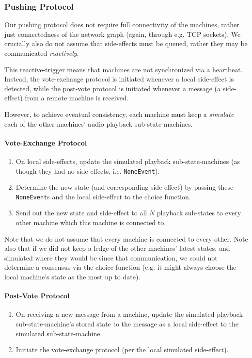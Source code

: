 \documentclass[%
               nonacm,sigconf,10pt]{acmart}
\newcommand{\py}[1]{\texttt{#1}}
\begin{document}
\subsubsection{Pushing Protocol}\label{subsubsec:push-proto}

Our pushing protocol does not require full connectivity of the machines, rather just connectedness of the network graph (again, through e.g. TCP sockets). We crucially also do not assume that side-effects must be queued, rather they may be communicated {\it reactively}. 

This reactive-trigger means that machines are not synchronized via a heartbeat. Instead, the vote-exchange protocol is initiated whenever a local side-effect is detected, while the post-vote protocol is initiated whenever a message (a side-effect) from a remote machine is received.

However, to achieve eventual consistency, each machine must keep a {\it simulate} each of the other machines' audio playback sub-state-machines.

\paragraph{Vote-Exchange Protocol}
\begin{enumerate}
    \item On local side-effects, update the simulated playback sub-state-machines (as though they had no side-effects, i.e. \py{NoneEvent}).
    \item Determine the new state (and corresponding side-effect) by passing these \py{NoneEvent}s and the local side-effect to the choice function.
    \item Send out the new state and side-effect to all $N$ playback sub-states to every other machine which this machine is connected to.
\end{enumerate}

Note that we do not assume that every machine is connected to every other. Note also that if we did not keep a ledge of the other machines' latest states, and simulated where they would be since that communication, we could not determine a consensus via the choice function (e.g. it might always choose the local machine's state as the most up to date). 

\paragraph{Post-Vote Protocol}
\begin{enumerate}
    \item On receiving a new message from a machine, update the simulated playback sub-state-machine's stored state to the message as a local side-effect to the simulated sub-state-machine.
    \item Initiate the vote-exchange protocol (per the local simulated side-effect).
\end{enumerate}
\end{document}
